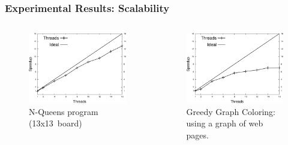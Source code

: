 \documentclass{beamer}
\begin{document}
\begin{frame}[fragile]
   \frametitle{Experimental Results: Scalability}
   \begin{columns}[t]
      \begin{figure}[b]
         \includegraphics[width=\textwidth]{speedup_8queens-13.pdf}
         \caption{N-Queens program (13x13~board)}
      \end{figure}
      \begin{figure}[b]
         \includegraphics[width=\textwidth]{speedup_greedy-graph-coloring-search_engines.pdf}
         \caption{Greedy Graph Coloring: using a graph of web pages.}
      \end{figure}
   \end{columns}
\end{frame}
\end{document}
